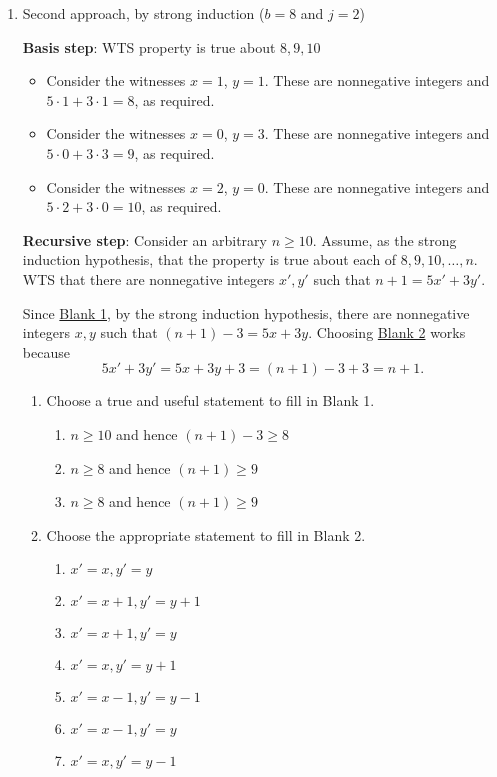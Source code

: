 \begin{enumerate}
\item  Second approach, by strong induction ($b=8$ and $j=2$)

{\bf Basis step}:  WTS property is true about  $8, 9, 10$
\begin{itemize}
\item Consider the witnesses $x = 1$, $y=1$. These 
are nonnegative integers and $5 \cdot 1 + 3 \cdot 1 = 8$, as
required.
\item Consider the witnesses $x = 0$, $y=3$. These 
are nonnegative integers and $5 \cdot 0 + 3 \cdot 3 = 9$, as
required.
\item Consider the witnesses $x = 2$, $y=0$. These 
are nonnegative integers and $5 \cdot 2 + 3 \cdot 0 = 10$, as
required.
\end{itemize}

{\bf Recursive step}: Consider an  arbitrary  $n \geq 10$.
Assume, as the strong induction hypothesis, 
that the property is true about each of $8, 9, 10, \ldots, n$.  
WTS
that there are nonnegative integers $x', y'$ such
that  $n+1 = 5x' +  3y'$. 

Since \underline{Blank 1}, 
by the strong induction hypothesis, there are nonnegative integers
$x, y$ such that $(n+1) - 3 = 5x + 3y$.
Choosing \underline{Blank 2} works because
\[
    5x' + 3y' = 5x + 3y + 3 = (n+1) - 3 + 3 = n+1.
\]


\begin{enumerate}
    \item Choose a true and useful statement to fill in Blank 1.
    \begin{enumerate}
        \item $n \geq 10$ and hence $(n+1) - 3 \geq 8$
        \item $n \geq 8$ and hence $(n+1) \geq 9$
        \item $n \geq 8$ and hence $(n+1) \geq 9$
    \end{enumerate}
    \item Choose the appropriate statement to fill in Blank 2.
    \begin{enumerate}
        \item $x' = x, y' = y$
        \item $x' = x+1, y' = y+1$
        \item $x' = x+1, y' = y$
        \item $x' = x, y' = y+1$
        \item $x' = x-1, y' = y-1$
        \item $x' = x-1, y' = y$
        \item $x' = x, y' = y-1$
    \end{enumerate}
\end{enumerate}
\end{enumerate}